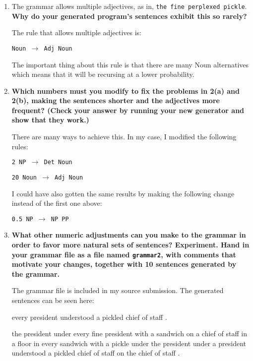 \documentclass[10pt]{article}
\begin{document}
\begin{enumerate}
\begin{enumerate}
\item The grammar allows multiple adjectives, as in, \verb|the fine perplexed pickle|. 
{\bf Why do your generated program's sentences exhibit this so rarely?}

\vspace{0.2cm}

The rule that allows multiple adjectives is:

{\tt Noun $\rightarrow$ Adj Noun}

The important thing about this rule is that there are many Noun alternatives which means that it will be recursing at a lower probability.

\item {\bf Which numbers must you modify to fix the problems in 2(a) and
    2(b), making the sentences shorter and the adjectives more
    frequent? (Check your answer by running your new generator and
    show that they work.)}

\vspace{0.2cm}

There are many ways to achieve this. In my case, I modified the following rules:

{\tt 2 NP $\rightarrow$ Det Noun}

{\tt 20 Noun $\rightarrow$ Adj Noun}

I could have also gotten the same results by making the following change instead of the first one above:

{\tt 0.5 NP $\rightarrow$ NP PP}

\item {\bf What other numeric adjustments can you make to the grammar in
  order to favor more natural sets of sentences? Experiment. Hand in
  your grammar file as a file named \verb+grammar2+, with comments that
  motivate your changes, together with 10 sentences generated by the
  grammar.}

\vspace{0.2cm}

The grammar file is included in my source submission. The generated sentences can be seen here:

{\tt

every president understood a pickled chief of staff .

\vspace{0.2cm}

the president under every fine president with a sandwich on a chief of staff in a floor in every sandwich with a pickle under the president under a president understood a pickled chief of staff on the chief of staff .

}
\end{enumerate}
\end{enumerate}
\end{document}

